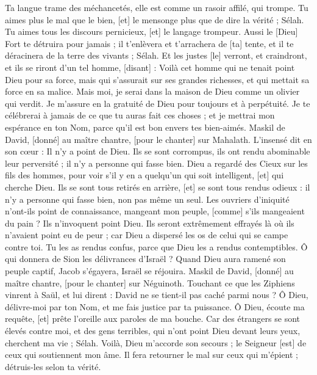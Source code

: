 \begin{multicols}{2}
Ta langue trame des méchancetés, elle est comme un rasoir affilé, qui trompe.
Tu aimes plus le mal que le bien, [et] le mensonge plus que de dire la vérité ; Sélah.
Tu aimes tous les discours pernicieux, [et] le langage trompeur.
Aussi le [Dieu] Fort te détruira pour jamais ; il t'enlèvera et t'arrachera de [ta] tente, et il te déracinera de la terre des vivants ; Sélah.
Et les justes [le] verront, et craindront, et ils se riront d'un tel homme, [disant] :
Voilà cet homme qui ne tenait point Dieu pour sa force, mais qui s'assurait sur ses grandes richesses, et qui mettait sa force en sa malice.
Mais moi, je serai dans la maison de Dieu comme un olivier qui verdit. Je m'assure en la gratuité de Dieu pour toujours et à perpétuité.
Je te célébrerai à jamais de ce que tu auras fait ces choses ; et je mettrai mon espérance en ton Nom, parce qu'il est bon envers tes bien-aimés.
\VerseOne{}Maskil de David, [donné] au maître chantre, [pour le chanter] sur Mahalath. L'insensé dit en son cœur : Il n'y a point de Dieu. Ils se sont corrompus, ils ont rendu abominable leur perversité ; il n'y a personne qui fasse bien.
Dieu a regardé des Cieux sur les fils des hommes, pour voir s'il y en a quelqu'un qui soit intelligent, [et] qui cherche Dieu.
Ils se sont tous retirés en arrière, [et] se sont tous rendus odieux : il n'y a personne qui fasse bien, non pas même un seul.
Les ouvriers d'iniquité n'ont-ils point de connaissance, mangeant mon peuple, [comme] s'ils mangeaient du pain ? Ils n'invoquent point Dieu.
Ils seront extrêmement effrayés là où ils n'avaient point eu de peur ; car Dieu a dispersé les os de celui qui se campe contre toi. Tu les as rendus confus, parce que Dieu les a rendus contemptibles.
Ô qui donnera de Sion les délivrances d'Israël ? Quand Dieu aura ramené son peuple captif, Jacob s'égayera, Israël se réjouira.
\VerseOne{}Maskil de David, [donné] au maître chantre, [pour le chanter] sur Néguinoth. Touchant ce que les Ziphiens vinrent à Saül, et lui dirent : David ne se tient-il pas caché parmi nous ? Ô Dieu, délivre-moi par ton Nom, et me fais justice par ta puissance.
Ô Dieu, écoute ma requête, [et] prête l'oreille aux paroles de ma bouche.
Car des étrangers se sont élevés contre moi, et des gens terribles, qui n'ont point Dieu devant leurs yeux, cherchent ma vie ; Sélah.
Voilà, Dieu m'accorde son secours ; le Seigneur [est] de ceux qui soutiennent mon âme.
Il fera retourner le mal sur ceux qui m'épient ; détruis-les selon ta vérité.

\end{multicols}
